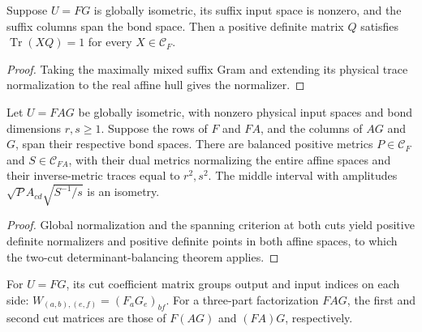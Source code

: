 \begin{lemma}
    \label{thm:mpu_affine_normalizer_global_isometry}
    \leanok
    Suppose $U=FG$ is globally isometric, its suffix input space is
    nonzero, and the suffix columns span the bond space. Then a
    positive definite matrix $Q$ satisfies
    $\operatorname{Tr}(XQ)=1$ for every $X\in\mathcal C_F$.
\end{lemma}
\begin{proof}\leanok
    Taking the maximally mixed suffix Gram and extending its physical
    trace normalization to the real affine hull gives the normalizer.
\end{proof}

\begin{lemma}
    \label{thm:mpu_balanced_interval_global_isometry}
    \leanok
    Let $U=FAG$ be globally isometric, with nonzero physical input
    spaces and bond dimensions $r,s\geq1$. Suppose the rows of $F$
    and $FA$, and the columns of $AG$ and $G$, span their respective
    bond spaces. There are balanced positive metrics
    $P\in\mathcal C_F$ and $S\in\mathcal C_{FA}$, with their dual
    metrics normalizing the entire affine spaces and their
    inverse-metric traces equal to $r^2,s^2$. The middle interval
    with amplitudes $\sqrt P A_{cd}\sqrt{S^{-1}/s}$ is an isometry.
\end{lemma}
\begin{proof}\leanok
    Global normalization and the spanning criterion at both
    cuts yield positive definite normalizers and positive
    definite points in both affine spaces, to which the two-cut
    determinant-balancing theorem applies.
\end{proof}

\begin{definition}
    \label{def:mpu_physical_coefficient_flattenings}
    \leanok
    For $U=FG$, its cut coefficient matrix groups output and input
    indices on each side:
    $W_{(a,b),(e,f)}=(F_aG_e)_{bf}$.
    For a three-part factorization $FAG$, the first and second cut
    matrices are those of $F(AG)$ and $(FA)G$, respectively.
\end{definition}

